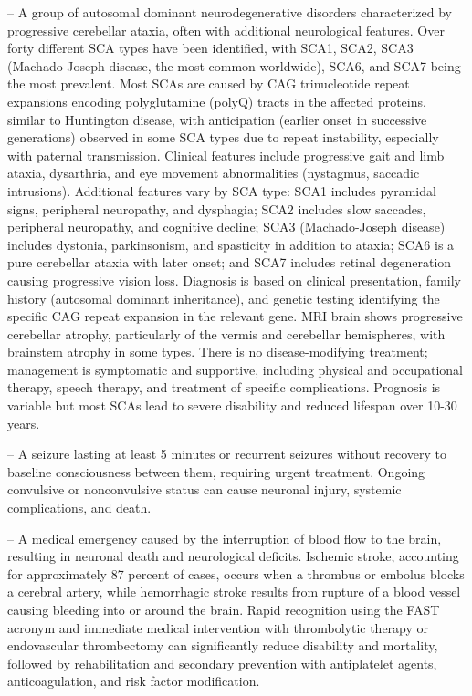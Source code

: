 -- A group of autosomal dominant neurodegenerative disorders characterized by progressive cerebellar ataxia, often with additional neurological features. Over forty different SCA types have been identified, with SCA1, SCA2, SCA3 (Machado-Joseph disease, the most common worldwide), SCA6, and SCA7 being the most prevalent. Most SCAs are caused by CAG trinucleotide repeat expansions encoding polyglutamine (polyQ) tracts in the affected proteins, similar to Huntington disease, with anticipation (earlier onset in successive generations) observed in some SCA types due to repeat instability, especially with paternal transmission. Clinical features include progressive gait and limb ataxia, dysarthria, and eye movement abnormalities (nystagmus, saccadic intrusions). Additional features vary by SCA type: SCA1 includes pyramidal signs, peripheral neuropathy, and dysphagia; SCA2 includes slow saccades, peripheral neuropathy, and cognitive decline; SCA3 (Machado-Joseph disease) includes dystonia, parkinsonism, and spasticity in addition to ataxia; SCA6 is a pure cerebellar ataxia with later onset; and SCA7 includes retinal degeneration causing progressive vision loss. Diagnosis is based on clinical presentation, family history (autosomal dominant inheritance), and genetic testing identifying the specific CAG repeat expansion in the relevant gene. MRI brain shows progressive cerebellar atrophy, particularly of the vermis and cerebellar hemispheres, with brainstem atrophy in some types. There is no disease-modifying treatment; management is symptomatic and supportive, including physical and occupational therapy, speech therapy, and treatment of specific complications. Prognosis is variable but most SCAs lead to severe disability and reduced lifespan over 10-30 years.

-- A seizure lasting at least 5 minutes or recurrent seizures without recovery to baseline consciousness between them, requiring urgent treatment. Ongoing convulsive or nonconvulsive status can cause neuronal injury, systemic complications, and death.

-- A medical emergency caused by the interruption of blood flow to the brain, resulting in neuronal death and neurological deficits. Ischemic stroke, accounting for approximately 87 percent of cases, occurs when a thrombus or embolus blocks a cerebral artery, while hemorrhagic stroke results from rupture of a blood vessel causing bleeding into or around the brain. Rapid recognition using the FAST acronym and immediate medical intervention with thrombolytic therapy or endovascular thrombectomy can significantly reduce disability and mortality, followed by rehabilitation and secondary prevention with antiplatelet agents, anticoagulation, and risk factor modification.

